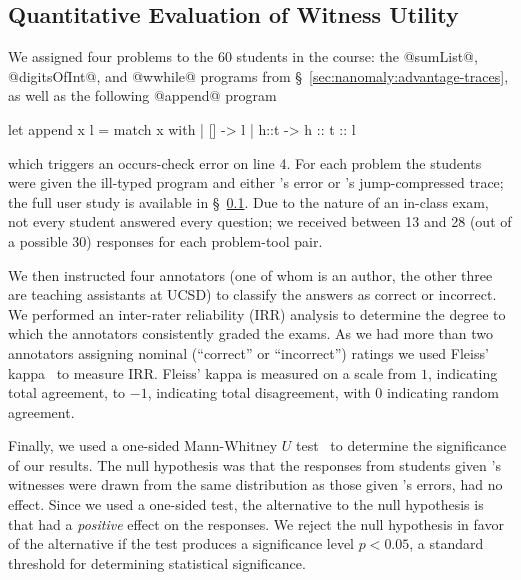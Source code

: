 \subsection{Quantitative Evaluation of Witness Utility}
\label{sec:nanomaly:user-study}
%
We assigned four problems to the 60 students in the course: the
@sumList@, \hbox{@digitsOfInt@,} and @wwhile@ programs from
\S~\ref{sec:nanomaly:advantage-traces}, as well as the following @append@ program
%
\begin{ecode}
  let append x l =
    match x with
    | []   -> l
    | h::t -> h :: t :: l
\end{ecode}
%
which triggers an occurs-check error on line 4.
%
For each problem the students were given the ill-typed program and
either \ocaml's error or \toolname's jump-compressed trace;
the full user study is available in \S~\ref{sec:nanomaly:user-study}.
%
Due to the nature of an in-class exam, not every student answered every
question; we received between 13 and 28 (out of a possible 30) responses
for each problem-tool pair.

We then instructed four annotators (one of whom is an author, the other
three are teaching assistants at UCSD) to classify the answers as
correct or incorrect.
%
We performed an inter-rater reliability (IRR) analysis to determine the
degree to which the annotators consistently graded the exams.
%
As we had more than two annotators assigning nominal (``correct'' or
``incorrect'') ratings we used Fleiss' kappa~\cite{Fleiss1971-du} to
measure IRR.\@
%
Fleiss' kappa is measured on a scale from $1$, indicating total
agreement, to $-1$, indicating total disagreement, with $0$ indicating
random agreement.

Finally, we used a one-sided Mann-Whitney $U$ test~\cite{Mann1947-fd} to
determine the significance of our results.
%
The null hypothesis was that the responses from students given
\toolname's witnesses were drawn from the same distribution as those
given \ocaml's errors, \ie \toolname had no effect.
%
Since we used a one-sided test, the alternative to the null hypothesis
is that \toolname had a \emph{positive} effect on the responses.
%
We reject the null hypothesis in favor of the alternative if the test
produces a significance level $p < 0.05$, a standard threshold for
determining statistical significance.

